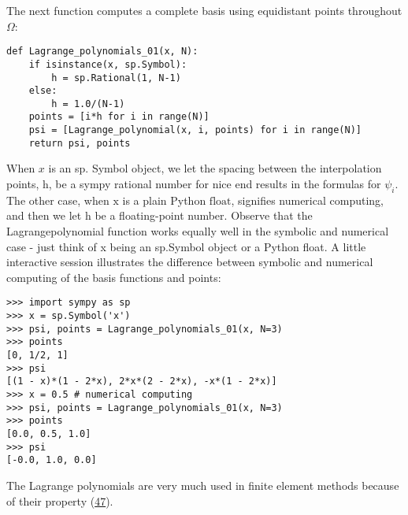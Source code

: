 \documentclass[../main.tex]{subfiles}
\begin{document}
The next function computes a complete basis using equidistant points throughout
$\Omega$:
\begin{lstlisting}[numbers=none]
def Lagrange_polynomials_01(x, N):
	if isinstance(x, sp.Symbol):
		h = sp.Rational(1, N-1)
	else:
		h = 1.0/(N-1)
	points = [i*h for i in range(N)]
	psi = [Lagrange_polynomial(x, i, points) for i in range(N)]
	return psi, points	
\end{lstlisting}
When $x$ is an sp. Symbol object, we let the spacing between the interpolation points, $\mathrm{h}$, be a sympy rational number for nice end results in the formulas for $\psi_{i}$. The other case, when $\mathrm{x}$ is a plain Python $\mathrm{float}$, signifies numerical computing, and then we let $\mathrm{h}$ be a floating-point number. Observe that the Lagrange\textunderscore polynomial function works equally well in the symbolic and numerical case - just think of x being an sp.Symbol object or a Python float. A little
interactive session illustrates the difference between symbolic and numerical
computing of the basis functions and points:
\begin{lstlisting}[numbers=none]
>>> import sympy as sp
>>> x = sp.Symbol('x')
>>> psi, points = Lagrange_polynomials_01(x, N=3)
>>> points
[0, 1/2, 1]
>>> psi
[(1 - x)*(1 - 2*x), 2*x*(2 - 2*x), -x*(1 - 2*x)]
>>> x = 0.5 # numerical computing
>>> psi, points = Lagrange_polynomials_01(x, N=3)
>>> points
[0.0, 0.5, 1.0]
>>> psi
[-0.0, 1.0, 0.0]	
\end{lstlisting}
The Lagrange polynomials are very much used in finite element methods because
of their property (\hyperref[eqa47]{47}).
\end{document}
